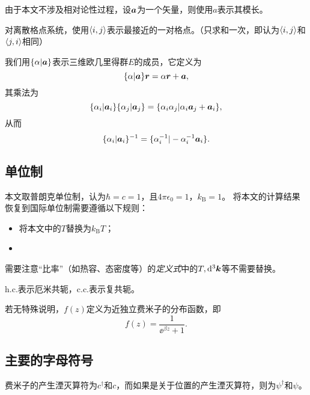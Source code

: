 由于本文不涉及相对论性过程，设$\vb*{a}$为一个矢量，则使用$a$表示其模长。

对离散格点系统，使用$\langle i, j \rangle$表示最接近的一对格点。（只求和一次，即认为$\langle i, j \rangle$和$\langle j, i \rangle$相同）

我们用$\{\alpha | \vb*{a} \}$表示三维欧几里得群$E$的成员，它定义为
\begin{equation}
    \{\alpha | \vb*{a} \} \vb*{r} = \alpha \vb*{r} + \vb*{a},
\end{equation}
其乘法为
\begin{equation}
    \{\alpha_i | \vb*{a}_i \} \{\alpha_j | \vb*{a}_j \} = \{ \alpha_i \alpha_j | \alpha_i \vb*{a}_j + \vb*{a}_i \},
\end{equation}
从而
\begin{equation}
    \{\alpha_i | \vb*{a}_i \}^{-1} = \{ \alpha_i^{-1} | - \alpha_i^{-1} \vb*{a}_i \}.
\end{equation}

\subsection*{单位制}

本文取普朗克单位制，认为$\hbar=c=1$，且$4\pi\epsilon_0=1$，$k_\text{B}=1$。
将本文的计算结果恢复到国际单位制需要遵循以下规则：
\begin{itemize}
    \item 将本文中的$T$替换为$k_\text{B} T$；
    \item 
\end{itemize}
需要注意“比率”（如热容、态密度等）的\emph{定义式}中的$T, \dd[3]{\vb*{k}}$等不需要替换。

$\text{h.c.}$表示厄米共轭，$\text{c.c.}$表示复共轭。

若无特殊说明，$f(z)$定义为近独立费米子的分布函数，即
\[
    f(z) = \frac{1}{\ee^{\beta z} + 1}.
\]

\subsection*{主要的字母符号}

费米子的产生湮灭算符为${c}^\dagger$和${c}$，而如果是关于位置的产生湮灭算符，则为${\psi}^\dagger$和${\psi}$。

